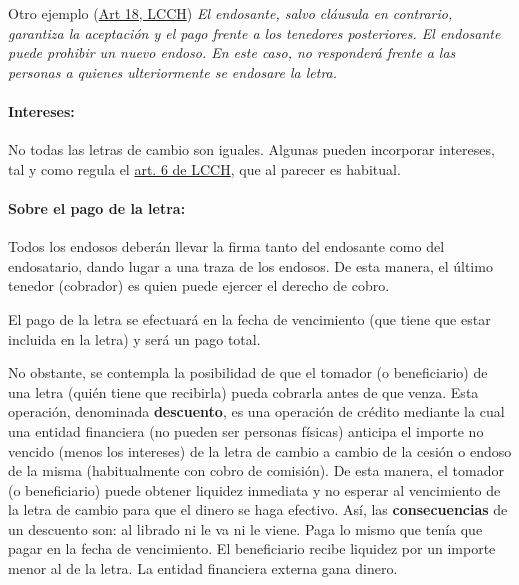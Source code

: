 \documentclass[nochap,palatino,shortheader]{apuntes}
\newcommand{\study}[1]{#1} \newcommand{\substudy}[1]{#1}
\begin{document}
Otro ejemplo (\href{https://www.boe.es/buscar/act.php?id=BOE-A-1985-14880&p=20150703&tn=1#acatorce}{Art 18, LCCH}) \textit{El endosante, salvo cláusula en contrario, garantiza la aceptación y el pago frente a los tenedores posteriores. \substudy{El endosante puede prohibir un nuevo endoso}. En este caso, \study{no responderá} frente a las personas a quienes \study{ulteriormente} se endosare la letra.}

\paragraph{Intereses: }

No todas las letras de cambio son iguales. Algunas pueden incorporar intereses, tal y como regula el \href{https://www.boe.es/buscar/act.php?id=BOE-A-1985-14880&p=20150703&tn=1#asexto}{art. 6 de LCCH}, que al parecer es habitual.

\paragraph{Sobre el pago de la letra: }

Todos los endosos deberán llevar la firma tanto del endosante como del endosatario, dando lugar a una traza de los endosos. De esta manera, el último tenedor (cobrador) es quien puede ejercer el derecho de cobro.


El pago de la letra se efectuará en la fecha de vencimiento (que tiene que estar incluida en la letra) y será un pago total.


No obstante, se contempla la posibilidad de que el tomador (o beneficiario) de una letra (quién tiene que recibirla) pueda cobrarla antes de que venza.
Esta operación, denominada \textbf{\study{descuento}}, es una operación de crédito mediante la cual una entidad financiera (\substudy{no pueden ser personas físicas}) anticipa el importe no vencido (menos los intereses) de la letra de cambio a cambio de la cesión o endoso de la misma (habitualmente con cobro de comisión).
De esta manera, el tomador (o beneficiario) puede obtener liquidez inmediata y no esperar al vencimiento de la letra de cambio para que el dinero se haga efectivo.
Así, las \textbf{\study{consecuencias}} de un descuento son: al librado ni le va ni le viene. Paga lo mismo que tenía que pagar en la fecha de vencimiento. El beneficiario recibe liquidez por un importe menor al de la letra. La entidad financiera externa gana dinero.
\end{document}
